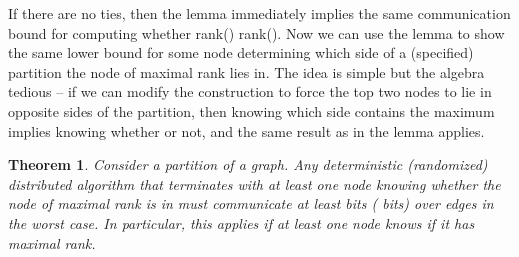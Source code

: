 \documentclass[twocolumn]{article}
\newtheorem{theorem}{Theorem}
\begin{document}
If there are no ties, then the lemma immediately implies the same communication bound for computing whether rank()  rank(). Now we can use the lemma to show the same lower bound for some node determining which side of a (specified) partition the node of maximal rank lies in. The idea is simple but the algebra tedious -- if we can modify the construction to force the top two nodes  to lie in opposite sides of the partition, then knowing which side contains the maximum implies knowing whether  or not, and the same result as in the lemma applies.
\begin{theorem}
\label{thm:ranks}
Consider a partition  of a graph. Any deterministic (randomized) distributed algorithm that terminates with at least one node knowing whether the node of maximal rank is in  must communicate at least  bits ( bits) over  edges in the worst case. In particular, this applies if at least one node  knows if it has maximal rank.
\end{theorem}
\end{document}
